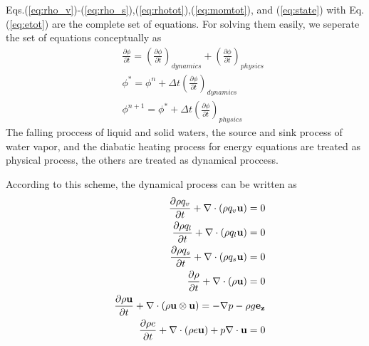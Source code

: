 Eqs.(\ref{eq:rho_v})-(\ref{eq:rho_s}),(\ref{eq:rhotot}),(\ref{eq:momtot}),
and (\ref{eq:state}) with Eq.(\ref{eq:etot}) are the complete set of equations.
For solving them easily, we seperate the set of equations conceptually as
\begin{eqnarray}
&&  \frac{\partial \phi}{\partial t} = 
\left(\frac{\partial \phi}{\partial t}\right)_{dynamics}
+\left(\frac{\partial \phi}{\partial t}\right)_{physics}\\
&&\phi^{*} = \phi^{n} + 
\Delta t \left(\frac{\partial \phi}{\partial t}\right)_{dynamics}\\
&&\phi^{n+1} = \phi^{*} + 
\Delta t \left(\frac{\partial \phi}{\partial t}\right)_{physics}
\end{eqnarray}
The falling proccess of liquid and solid waters,
the source and sink process of water vapor, and
the diabatic heating process for energy equations are treated
as physical process, the others are treated as dynamical proccess.

According to this scheme,
the dynamical process can be written as
\begin{eqnarray}
&&  \frac{\partial \rho q_v}{\partial t}
+ \nabla \cdot\left(\rho q_v {\bf u}\right)  = 0
\label{eq:rho_v_d}\\
&&  \frac{\partial \rho q_l}{\partial t}
+ \nabla \cdot\left(\rho q_l {\bf u}\right) = 0
\label{eq:rho_l_d}\\
&&  \frac{\partial \rho q_s}{\partial t}
+ \nabla \cdot\left(\rho q_s {\bf u}\right)
= 0
\label{eq:rho_s_d}\\
&&  \frac{\partial \rho}{\partial t}
+ \nabla\cdot\left(\rho{\bf u}\right) 
=0 \label{eq:rhotot_d}\\
&&  \frac{\partial \rho {\bf u}}{\partial t}
+ \nabla \cdot \left(\rho{\bf u} \otimes {\bf u}\right)  
= 
-\nabla p - \rho g {\bf e_z} \label{eq:momtot_d}\\
&&  \frac{\partial \rho e  }{\partial t}
+  \nabla \cdot \left( \rho e {\bf u} \right)
 + p \nabla \cdot {\bf u}
=  0 \label{eq:etot_d}
\end{eqnarray}

